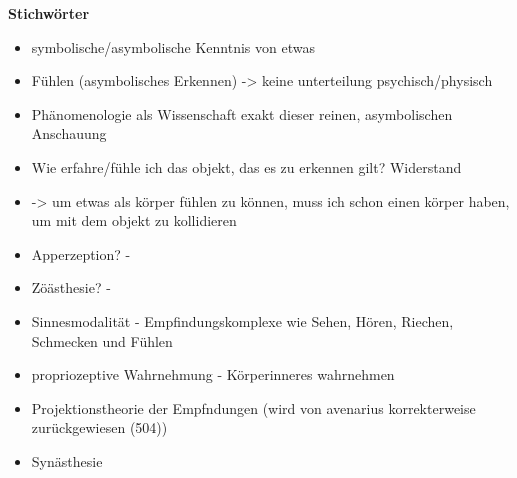 \documentclass[a4paper, 12pt]{article}
\begin{document}
\begin{onehalfspace}
\vspace{5mm}
\noindent\textbf{Stichwörter}
\begin{itemize}
  \item symbolische/asymbolische Kenntnis von etwas
  \item Fühlen (asymbolisches Erkennen) -> keine unterteilung psychisch/physisch
  \item Phänomenologie als Wissenschaft exakt dieser reinen, asymbolischen Anschauung
  \item Wie erfahre/fühle ich das objekt, das es zu erkennen gilt? Widerstand
  \item -> um etwas als körper fühlen zu können, muss ich schon einen körper haben, um mit dem objekt zu kollidieren 
  \item Apperzeption? - 
  \item Zöästhesie? - 
  \item Sinnesmodalität - Empfindungskomplexe wie Sehen, Hören, Riechen, Schmecken und Fühlen
  \item propriozeptive Wahrnehmung - Körperinneres wahrnehmen
  \item Projektionstheorie der Empfndungen (wird von avenarius korrekterweise zurückgewiesen (504))
  \item Synästhesie
\end{itemize}



\newpage

\end{onehalfspace}
\nocite{*}
\printbibliography
\end{document}
